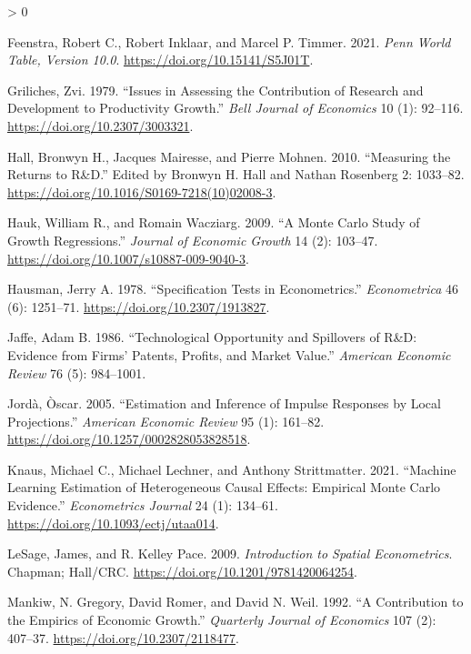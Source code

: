 \documentclass[
  11pt,
]{article}
\newlength{\cslhangindent}
\newenvironment{CSLReferences}[2] %
 {%
  \setlength{\parindent}{0pt}
  \ifodd #1 \everypar{\setlength{\hangindent}{\cslhangindent}}\ignorespaces\fi
  \ifnum #2 > 0
  \setlength{\parskip}{#2\baselineskip}
  \fi
 }%
 {}
\begin{document}
\begin{CSLReferences}{1}{0}
\leavevmode{}%
Feenstra, Robert C., Robert Inklaar, and Marcel P. Timmer. 2021. \emph{Penn World Table, Version 10.0}. \url{https://doi.org/10.15141/S5J01T}.

\leavevmode{}%
Griliches, Zvi. 1979. {``Issues in Assessing the Contribution of Research and Development to Productivity Growth.''} \emph{Bell Journal of Economics} 10 (1): 92--116. \url{https://doi.org/10.2307/3003321}.

\leavevmode{}%
Hall, Bronwyn H., Jacques Mairesse, and Pierre Mohnen. 2010. {``Measuring the Returns to {R\&D}.''} Edited by Bronwyn H. Hall and Nathan Rosenberg 2: 1033--82. \url{https://doi.org/10.1016/S0169-7218(10)02008-3}.

\leavevmode{}%
Hauk, William R., and Romain Wacziarg. 2009. {``A Monte Carlo Study of Growth Regressions.''} \emph{Journal of Economic Growth} 14 (2): 103--47. \url{https://doi.org/10.1007/s10887-009-9040-3}.

\leavevmode{}%
Hausman, Jerry A. 1978. {``Specification Tests in Econometrics.''} \emph{Econometrica} 46 (6): 1251--71. \url{https://doi.org/10.2307/1913827}.

\leavevmode{}%
Jaffe, Adam B. 1986. {``Technological Opportunity and Spillovers of {R\&D}: Evidence from Firms' Patents, Profits, and Market Value.''} \emph{American Economic Review} 76 (5): 984--1001.

\leavevmode{}%
Jordà, Òscar. 2005. {``Estimation and Inference of Impulse Responses by Local Projections.''} \emph{American Economic Review} 95 (1): 161--82. \url{https://doi.org/10.1257/0002828053828518}.

\leavevmode{}%
Knaus, Michael C., Michael Lechner, and Anthony Strittmatter. 2021. {``Machine Learning Estimation of Heterogeneous Causal Effects: Empirical Monte Carlo Evidence.''} \emph{Econometrics Journal} 24 (1): 134--61. \url{https://doi.org/10.1093/ectj/utaa014}.

\leavevmode{}%
LeSage, James, and R. Kelley Pace. 2009. \emph{Introduction to Spatial Econometrics}. Chapman; Hall/CRC. \url{https://doi.org/10.1201/9781420064254}.

\leavevmode{}%
Mankiw, N. Gregory, David Romer, and David N. Weil. 1992. {``A Contribution to the Empirics of Economic Growth.''} \emph{Quarterly Journal of Economics} 107 (2): 407--37. \url{https://doi.org/10.2307/2118477}.


\end{CSLReferences}
\end{document}
